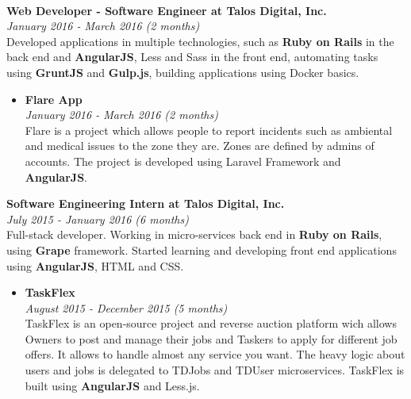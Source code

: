 \documentclass[margin, 10pt]{res} %
\begin{document}
\begin{resume}
\textbf{\\Web Developer - Software Engineer at Talos Digital, Inc.} \\
\textit{January 2016 - March 2016 (2 months)} \\
Developed applications in multiple technologies, such as \textbf{Ruby on Rails} in the back end and
\textbf{AngularJS}, Less and Sass in the front end, automating tasks using \textbf{GruntJS} and
\textbf{Gulp.js}, building applications using Docker basics.
\begin{itemize}
  \item \textbf{Flare App} \\
        \textit{January 2016 - March 2016 (2 months)} \\
        Flare is a project which allows people to report incidents such as ambiental and medical
        issues to the zone they are. Zones are defined by admins of accounts. The project is
        developed using Laravel Framework and \textbf{AngularJS}. \\
\end{itemize}

\textbf{Software Engineering Intern at Talos Digital, Inc.} \\
\textit{July 2015 - January 2016 (6 months)} \\
Full-stack developer. Working in micro-services back end in \textbf{Ruby on Rails}, using
\textbf{Grape} framework. Started learning and developing front end applications using
\textbf{AngularJS}, HTML and CSS.

\begin{itemize}
  \item \textbf{TaskFlex} \\
        \textit{August 2015 - December 2015 (5 months)} \\
        TaskFlex is an open-source project and reverse auction platform wich allows Owners to post
        and manage their jobs and Taskers to apply for different job offers. It allows to handle
        almost any service you want. The heavy logic about users and jobs is delegated to TDJobs and
        TDUser microservices. TaskFlex is built using \textbf{AngularJS} and Less.js. \\


\end{itemize}
\end{resume}
\end{document}
